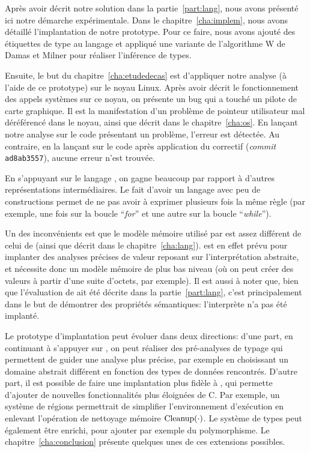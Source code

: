 Après avoir décrit notre solution dans la partie~\ref{part:lang}, nous avons
présenté ici notre démarche expérimentale. Dans le chapitre~\ref{cha:implem},
nous avons détaillé l'implantation de notre prototype. Pour ce faire, nous avons
ajouté des étiquettes de type au langage \newspeak et appliqué une variante de
l'algorithme W de Damas et Milner pour réaliser l'inférence de types.

Ensuite, le but du chapitre~\ref{cha:etudedecas} est d'appliquer notre analyse
(à l'aide de ce prototype) sur le noyau Linux. Après avoir décrit le
fonctionnement des appels systèmes sur ce noyau, on présente un bug qui a touché
un pilote de carte graphique. Il est la manifestation d'un problème de pointeur
utilisateur mal déréférencé dans le noyau, ainsi que décrit dans le
chapitre~\ref{cha:os}. En lançant notre analyse sur le code présentant un
problème, l'erreur est détectée. Au contraire, en la lançant sur le code après
application du correctif (\emph{commit} \texttt{ad8ab3557}), aucune erreur n'est
trouvée.

En s'appuyant sur le langage \newspeak, on gagne beaucoup par rapport à d'autres
représentations intermédiaires. Le fait d'avoir un langage avec peu de
constructions permet de ne pas avoir à exprimer plusieurs fois la même règle
(par exemple, une fois sur la boucle \enquote{\emph{for}} et une autre sur la
boucle \enquote{\emph{while}}).

Un des inconvénients est que le modèle mémoire utilisé par \newspeak est assez
différent de celui de \langname (ainsi que décrit dans le
chapitre~\ref{cha:lang}). \newspeak est en effet prévu pour implanter des
analyses précises de valeur reposant sur l'interprétation abstraite, et
nécessite donc un modèle mémoire de plus bas niveau (où on peut créer des
valeurs à partir d'une suite d'octets, par exemple). Il est aussi à noter que,
bien que l'évaluation de \langname ait été décrite dans la
partie~\ref{part:lang}, c'est principalement dans le but de démontrer des
propriétés sémantiques: l'interprète n'a pas été implanté.

Le prototype d'implantation peut évoluer dans deux directions: d'une part, en
continuant à s'appuyer sur \newspeak, on peut réaliser des pré-analyses de
typage qui permettent de guider une analyse plus précise, par exemple en
choisissant un domaine abstrait différent en fonction des types de données
rencontrés. D'autre part, il est possible de faire une implantation plus fidèle
à \langname, qui permette d'ajouter de nouvelles fonctionnalités plus éloignées
de C. Par exemple, un système de régions permettrait de simplifier
l'environnement d'exécution en enlevant l'opération de nettoyage mémoire
$\mathrm{Cleanup}(\cdot)$. Le système de types peut également être enrichi, pour ajouter
par exemple du polymorphisme. Le chapitre~\ref{cha:conclusion} présente quelques
unes de ces extensions possibles.

